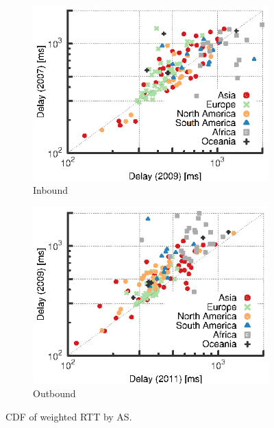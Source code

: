 \begin{figure}
    \centering
    \begin{subfigure}[b]{0.5\linewidth}
        \includegraphics{figures/malawi/rtt_comp_07_09}
        \caption{Inbound}
    \end{subfigure}%
    \begin{subfigure}[b]{0.5\linewidth}
        \includegraphics{figures/malawi/rtt_comp_09_11}
        \caption{Outbound}
    \end{subfigure}%
    \caption{CDF of weighted RTT by AS. \label{fig:rtt_comp}}
\end{figure}

